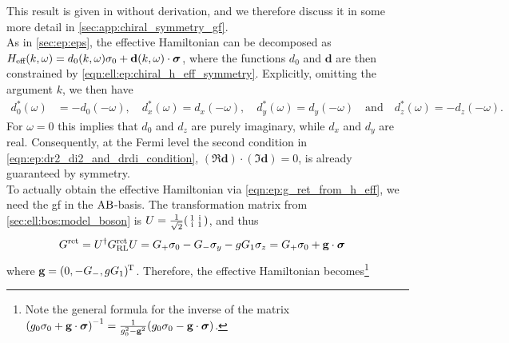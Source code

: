 This result is given in \cite{EP_DynamicInduced_Quenched_Lehmann_2021} without derivation, and we therefore discuss it in some more detail in \autoref{sec:app:chiral_symmetry_gf}.\\
As in \autoref{sec:ep:eps}, the effective Hamiltonian can be decomposed as $H_{\text{eff}}(k,\omega) = d_0(k,\omega)\sigma_0 + \textbf{d}(k,\omega)\cdot \bm{\sigma}$, where the functions $d_0$ and $\textbf{d}$ are then constrained by \autoref{eqn:ell:ep:chiral_h_eff_symmetry}.
Explicitly, omitting the argument $k$, we then have
\begin{align*}
d_0^\ast(\omega) &= -d_0(-\omega), \quad d_x^\ast(\omega) = d_x(-\omega), \quad d_y^\ast(\omega) = d_y(-\omega) \quad\text{and} \quad d_z^\ast(\omega) = -d_z(-\omega).
\end{align*}
For $\omega=0$ this implies that $d_0$ and $d_z$ are purely imaginary, while $d_x$ and $d_y$ are real.
Consequently, at the Fermi level the second condition in \autoref{eqn:ep:dr2_di2_and_drdi_condition}, $(\Re \textbf{d})\cdot (\Im \textbf{d}) = 0$, is already guaranteed by symmetry.\\
To actually obtain the effective Hamiltonian via \autoref{eqn:ep:g_ret_from_h_eff}, we need the \gls{gf} in the $\text{A}\text{B}$-basis.
The transformation matrix from \autoref{sec:ell:bos:model_boson} is $U=\frac{1}{\sqrt{2}} \begin{psmallmatrix} 1 & \text{i} \\ \text{i} & 1 \end{psmallmatrix}$, and thus
\begin{align*}
G^{\text{ret}} &= U^\dagger G^{\text{ret}}_{\text{R}\text{L}} U = G_+\sigma_0 - G_-\sigma_y - gG_1\sigma_z = G_+\sigma_0 + \textbf{g} \cdot \bm{\sigma}
\end{align*}%
where $\textbf{g}=(0, -G_-, gG_1)^{\mkern-1.5mu\text{T}}$.
Therefore, the effective Hamiltonian becomes\footnote{Note the general formula for the inverse of the matrix $\kla*{g_0 \sigma_0 + \textbf{g}\cdot \bm{\sigma}}^{-1} = \frac{1}{g_0^2 - \textbf{g}^2} \kla*{g_0 \sigma_0 - \textbf{g}\cdot\bm{\sigma}}$. }
